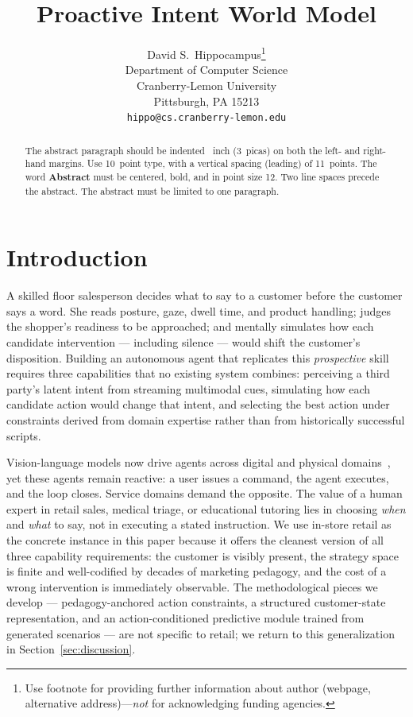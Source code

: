 \documentclass{article}
\title{Proactive Intent World Model}
\author{%
  David S.~Hippocampus\thanks{Use footnote for providing further information
    about author (webpage, alternative address)---\emph{not} for acknowledging
    funding agencies.} \\
  Department of Computer Science\\
  Cranberry-Lemon University\\
  Pittsburgh, PA 15213 \\
  \texttt{hippo@cs.cranberry-lemon.edu} \\
}
\begin{document}
\maketitle


\begin{abstract}
  The abstract paragraph should be indented ~inch (3~picas) on both the left- and right-hand margins. Use 10~point type, with a vertical spacing (leading) of 11~points. The word \textbf{Abstract} must be centered, bold, and in point size 12. Two line spaces precede the abstract. The abstract must be limited to one paragraph.
\end{abstract}

\section{Introduction}

A skilled floor salesperson decides what to say to a customer before the customer says a word. She reads posture, gaze, dwell time, and product handling; judges the shopper's readiness to be approached; and mentally simulates how each candidate intervention --- including silence --- would shift the customer's disposition. Building an autonomous agent that replicates this \emph{prospective} skill requires three capabilities that no existing system combines: perceiving a third party's latent intent from streaming multimodal cues, simulating how each candidate action would change that intent, and selecting the best action under constraints derived from domain expertise rather than from historically successful scripts.

Vision-language models now drive agents across digital and physical domains~\cite{Mind2Web,SeeClick,SWEAgent,SayCan,DrHouse}, yet these agents remain reactive: a user issues a command, the agent executes, and the loop closes. Service domains demand the opposite. The value of a human expert in retail sales, medical triage, or educational tutoring lies in choosing \emph{when} and \emph{what} to say, not in executing a stated instruction. We use in-store retail as the concrete instance in this paper because it offers the cleanest version of all three capability requirements: the customer is visibly present, the strategy space is finite and well-codified by decades of marketing pedagogy, and the cost of a wrong intervention is immediately observable. The methodological pieces we develop --- pedagogy-anchored action constraints, a structured customer-state representation, and an action-conditioned predictive module trained from generated scenarios --- are not specific to retail; we return to this generalization in Section~\ref{sec:discussion}.
\end{document}
